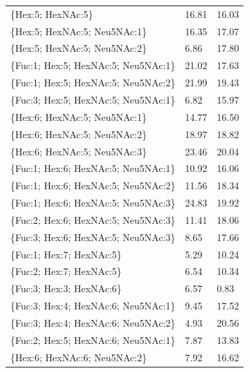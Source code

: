 \begin{table}
\begin{minipage}[t]{0.55\linewidth}
\begin{small}
\begin{tabular}{l|p{2cm} p{2cm}}
\{Hex:5; HexNAc:5\}                   &                16.81 &              16.03 \\
\{Hex:5; HexNAc:5; Neu5NAc:1\}        &                16.35 &              17.07 \\
\{Hex:5; HexNAc:5; Neu5NAc:2\}        &                 6.86 &              17.80 \\
\{Fuc:1; Hex:5; HexNAc:5; Neu5NAc:1\} &                21.02 &              17.63 \\
\{Fuc:1; Hex:5; HexNAc:5; Neu5NAc:2\} &                21.99 &              19.43 \\
\{Fuc:3; Hex:5; HexNAc:5; Neu5NAc:1\} &                 6.82 &              15.97 \\
\{Hex:6; HexNAc:5; Neu5NAc:1\}        &                14.77 &              16.50 \\
\{Hex:6; HexNAc:5; Neu5NAc:2\}        &                18.97 &              18.82 \\
\{Hex:6; HexNAc:5; Neu5NAc:3\}        &                23.46 &              20.04 \\
\{Fuc:1; Hex:6; HexNAc:5; Neu5NAc:1\} &                10.92 &              16.06 \\
\{Fuc:1; Hex:6; HexNAc:5; Neu5NAc:2\} &                11.56 &              18.34 \\
\{Fuc:1; Hex:6; HexNAc:5; Neu5NAc:3\} &                24.83 &              19.92 \\
\{Fuc:2; Hex:6; HexNAc:5; Neu5NAc:3\} &                11.41 &              18.06 \\
\{Fuc:3; Hex:6; HexNAc:5; Neu5NAc:3\} &                 8.65 &              17.66 \\
\{Fuc:1; Hex:7; HexNAc:5\}            &                 5.29 &              10.24 \\
\{Fuc:2; Hex:7; HexNAc:5\}            &                 6.54 &              10.34 \\
\{Fuc:3; Hex:3; HexNAc:6\}            &                 6.57 &               0.83 \\
\{Fuc:3; Hex:4; HexNAc:6; Neu5NAc:1\} &                 9.45 &              17.52 \\
\{Fuc:3; Hex:4; HexNAc:6; Neu5NAc:2\} &                 4.93 &              20.56 \\
\{Fuc:2; Hex:5; HexNAc:6; Neu5NAc:1\} &                 7.87 &              13.83 \\
\{Hex:6; HexNAc:6; Neu5NAc:2\}        &                 7.92 &              16.62 \\

\end{tabular}
\end{small}
\end{minipage}
\end{table}
